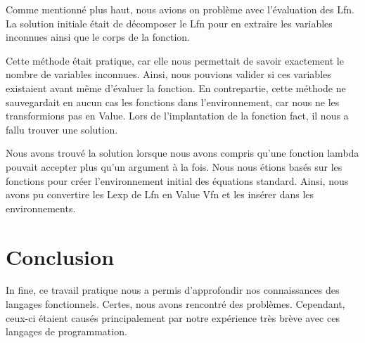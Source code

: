 \documentclass[12pt, letterpaper]{article}
\begin{document}
Comme mentionné plus haut, nous avions on problème avec l'évaluation des Lfn. 
La solution initiale était de décomposer le Lfn pour en extraire les variables 
inconnues ainsi que le corps de la fonction.

Cette méthode était pratique, car elle nous permettait de savoir exactement le
nombre de variables inconnues. Ainsi, nous pouvions valider si ces variables 
existaient avant même d'évaluer la fonction. En contrepartie, cette méthode 
ne sauvegardait en aucun cas les fonctions dans l'environnement, car nous ne 
les transformions pas en Value. Lors de l'implantation de la fonction fact,
il nous a fallu trouver une solution.

Nous avons trouvé la solution lorsque nous avons compris qu'une fonction lambda
pouvait accepter plus qu'un argument à la fois. Nous nous étions basés sur les 
fonctions pour créer l'environnement initial des équations standard.
Ainsi, nous avons pu convertire les Lexp de Lfn en Value Vfn et les insérer 
dans les environnements.

\section*{Conclusion}

In fine, ce travail pratique nous a permis d'approfondir nos connaissances 
des langages fonctionnels. Certes, nous avons rencontré des problèmes. 
Cependant, ceux-ci étaient causés principalement par notre expérience très brève 
avec ces langages de programmation.  
\end{document}
